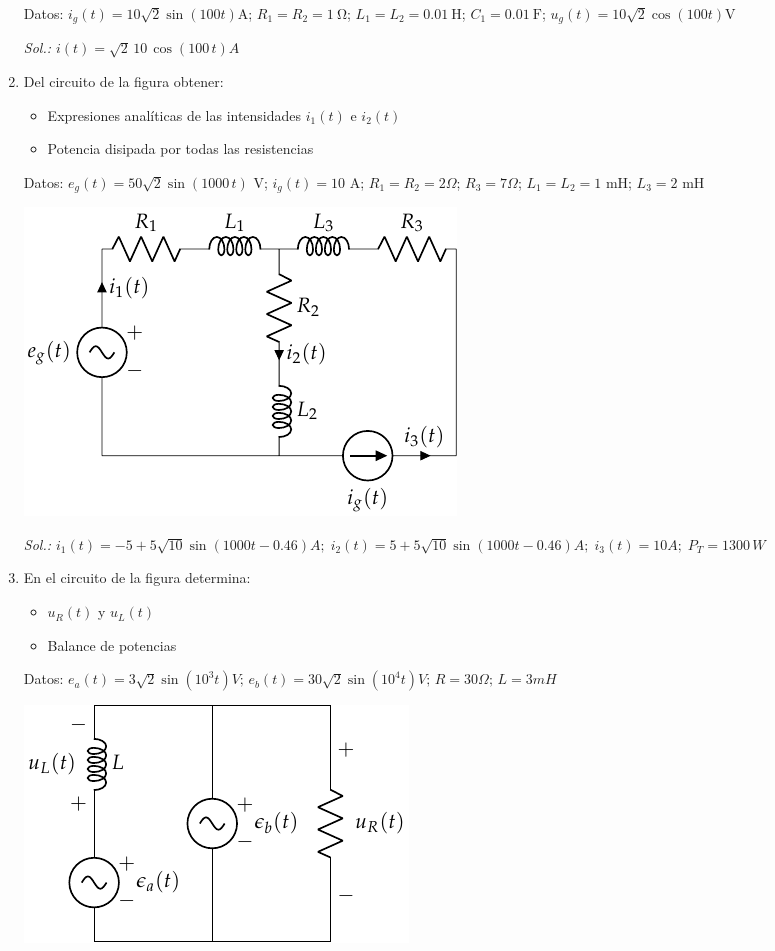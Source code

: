 \begin{enumerate}
Datos: $i_g(t) = 10\sqrt{2}\sin(100t)\unit{\ampere}$; $R_1 = R_2 = \qty{1}{\ohm}$; $L_1 = L_2 = \qty{0.01}{\henry}$; $C_1 = \qty{0.01}{\farad}$; $u_g(t) = 10\sqrt{2}\cos(100t)\unit{\volt}$


  \emph{Sol.: $i(t)=\sqrt{2}\,10\,\cos(100\,t) A$}

\item Del circuito de la figura obtener:
  \begin{itemize}
  \item Expresiones analíticas de las intensidades $i_1(t)$ e $i_2(t)$
  \item Potencia disipada por todas las resistencias
  \end{itemize}

  Datos: $e_g(t)=50\sqrt{2}\sin(1000\,t)$ V; $i_g(t)=10$ A;
  $R_1=R_2=2\Omega$; $R_3=7\Omega$; $L_1=L_2=1$ mH; $L_3=2$ mH
  \begin{center}
    \includegraphics{../figs/ej18_BT2.pdf}
  \end{center}
  \emph{Sol.:
    $i_1(t)= -5+5\sqrt{10}\sin(1000t-0.46) A;\; i_2(t)=
    5+5\sqrt{10}\sin(1000t-0.46) A;\; i_3(t)= 10 A;\; P_T=1300\,W$}

\item En el circuito de la figura determina:
  \begin{itemize}
  \item $u_R(t)$ y $u_L(t)$
  \item Balance de potencias
  \end{itemize}
  Datos:
  $e_a(t) = {3\sqrt{2} \sin(10^3 t)} V;\,e_b(t) = {30\sqrt{2}
    \sin(10^4 t)} V;\,R = {30}{\Omega};\,L = {3}{mH}$
  \begin{center}
    \includegraphics{../figs/superposicion2_ej.pdf}
  \end{center}


\end{enumerate}
